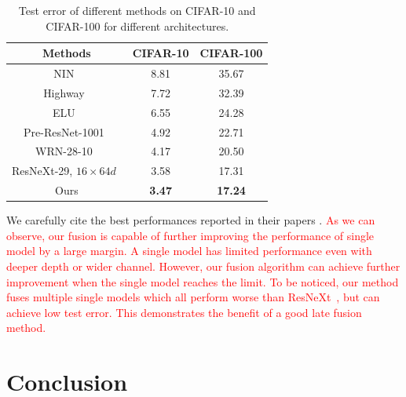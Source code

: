 \documentclass[10pt,twocolumn,letterpaper]{article}
\def\yanred{\textcolor{red}}
\begin{document}
\begin{table}[ht]
\centering
\begin{tabular}{|c|c|c|}\hline
    Methods                                         &  CIFAR-10       & CIFAR-100           \\\hline
NIN~\cite{lin2013network}                           &   8.81          &  35.67              \\\hline
Highway~\cite{srivastava2015highway}                &   7.72          &  32.39              \\\hline
ELU~\cite{clevert2015fast}                          &   6.55          &  24.28              \\\hline
Pre-ResNet-1001~\cite{he2016identity}               &   4.92          &  22.71              \\\hline
WRN-28-10~\cite{zagoruyko2016wide}                  &   4.17          &  20.50              \\\hline
ResNeXt-29, $16\times64d$~\cite{xie2016aggregated}  &   3.58          &  17.31              \\\hline
Ours                                                &   \textbf{3.47} &  \textbf{17.24}     \\\hline
\end{tabular}
\caption{Test error of different methods on CIFAR-10 and CIFAR-100 for different architectures.
}
\label{table:state_of_the_art}
\end{table}

We carefully cite the best performances reported in their papers
\cite{clevert2015fast,he2016identity,lin2013network,srivastava2015highway,xie2016aggregated,zagoruyko2016wide}.
\yanred{
As we can observe, our fusion is capable of further improving the performance of single model by a large margin.
A single model has limited performance even with deeper depth or wider channel.
However, our fusion algorithm can achieve further improvement when the single model reaches the limit.
To be noticed, our method fuses multiple single models which all perform worse than ResNeXt~\cite{xie2016aggregated},
but can achieve low test error.
This demonstrates the benefit of a good late fusion method.
}

\section{Conclusion}
\end{document}
